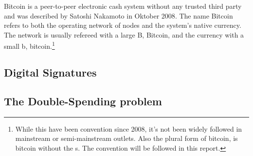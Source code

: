 Bitcoin is a peer-to-peer electronic cash system without any trusted third party and was described by Satoshi Nakamoto in Oktober 2008\cite{nakamoto:bitcoin}. The name Bitcoin refers to both the operating network of nodes and the system's native currency. The network is usually refereed with a large B, Bitcoin, and the currency with a small b, bitcoin.\footnote{While this have been convention since 2008, it's not been widely followed in mainstream or semi-mainstream outlets. Also the plural form of bitcoin, is bitcoin without the s. The convention will be followed in this report.}

\subsection{Digital Signatures}
\subsection{The Double-Spending problem}